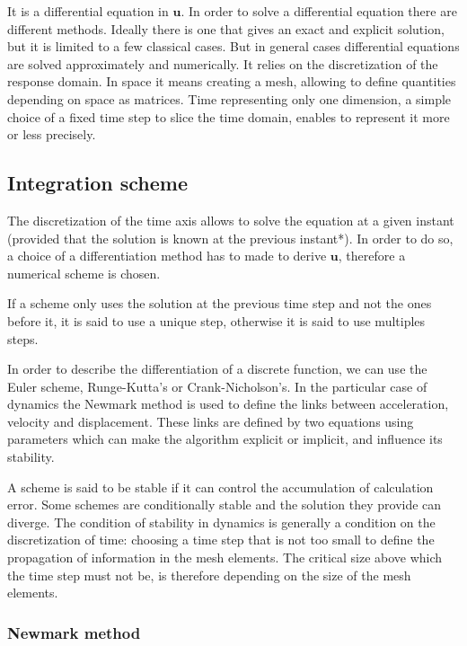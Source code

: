 \documentclass[12pt,a4paper]{article}
\begin{document}
It is a differential equation in $\mathbf{u}$. In order to solve a differential equation there are different methods. Ideally there is one that gives an exact and explicit solution, but it is limited to a few classical cases. But in general cases differential equations are solved approximately and numerically. It relies on the discretization of the response domain. In space it means creating a mesh, allowing to define quantities depending on space as matrices. Time representing only one dimension, a simple choice of a fixed time step to slice the time domain, enables to represent it more or less precisely.

\subsection{Integration scheme}
\label{SchemasDIntegration}

The discretization of the time axis allows to solve the equation at a given instant (provided that the solution is known at the previous instant*). In order to do so, a choice of a differentiation method has to made to derive $\mathbf{u}$, therefore a numerical scheme is chosen.

\noindent *If a scheme only uses the solution at the previous time step and not the ones before it, it is said to use a unique step, otherwise it is said to use multiples steps.

In order to describe the differentiation of a discrete function, we can use the Euler scheme, Runge-Kutta's or Crank-Nicholson's. In the particular case of dynamics the Newmark method is used to define the links between acceleration, velocity and displacement. These links are defined by two equations using parameters which can make the algorithm explicit or implicit, and influence its stability.

A scheme is said to be stable if it can control the accumulation of calculation error. Some schemes are conditionally stable and the solution they provide can diverge. The condition of stability in dynamics is generally a condition on the discretization of time: choosing a time step that is not too small to define the propagation of information in the mesh elements. The critical size above which the time step must not be, is therefore depending on the size of the mesh elements.

\subsubsection{Newmark method}
\end{document}
